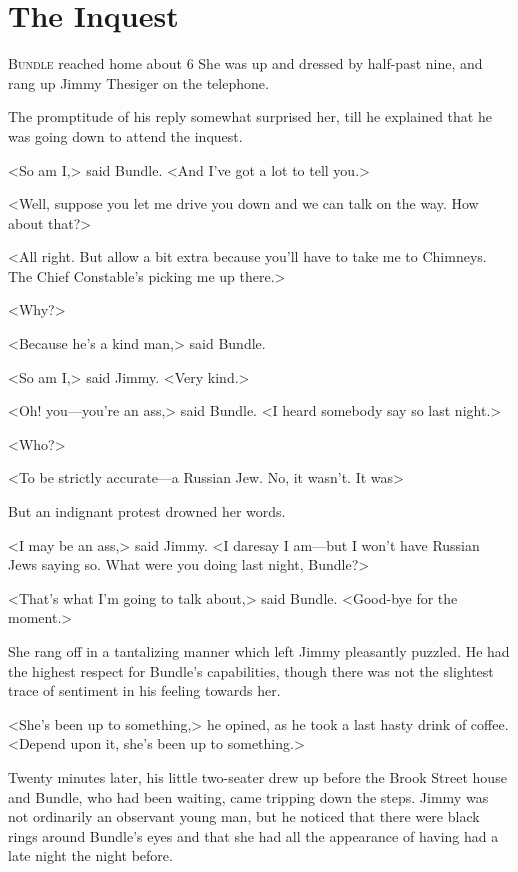 \chapter{The Inquest}

\lettrine{B}{undle} reached home about 6  She was up and dressed by half-past nine, and rang up Jimmy Thesiger on the telephone.

\zz
The promptitude of his reply somewhat surprised her, till he explained that he was going down to attend the inquest.

<So am I,> said Bundle. <And I've got a lot to tell you.>

<Well, suppose you let me drive you down and we can talk on the way. How about that?>

<All right. But allow a bit extra because you'll have to take me to Chimneys. The Chief Constable's picking me up there.>

<Why?>

<Because he's a kind man,> said Bundle.

<So am I,> said Jimmy. <Very kind.>

<Oh! you—you're an ass,> said Bundle. <I heard somebody say so last night.>

<Who?>

<To be strictly accurate—a Russian Jew. No, it wasn't. It was\longdash>

But an indignant protest drowned her words.

<I may be an ass,> said Jimmy. <I daresay I am—but I won't have Russian Jews saying so. What were you doing last night, Bundle?>

<That's what I'm going to talk about,> said Bundle. <Good-bye for the moment.>

She rang off in a tantalizing manner which left Jimmy pleasantly puzzled. He had the highest respect for Bundle's capabilities, though there was not the slightest trace of sentiment in his feeling towards her.

<She's been up to something,> he opined, as he took a last hasty drink of coffee. <Depend upon it, she's been up to something.>

Twenty minutes later, his little two-seater drew up before the Brook Street house and Bundle, who had been waiting, came tripping down the steps. Jimmy was not ordinarily an observant young man, but he noticed that there were black rings around Bundle's eyes and that she had all the appearance of having had a late night the night before.

